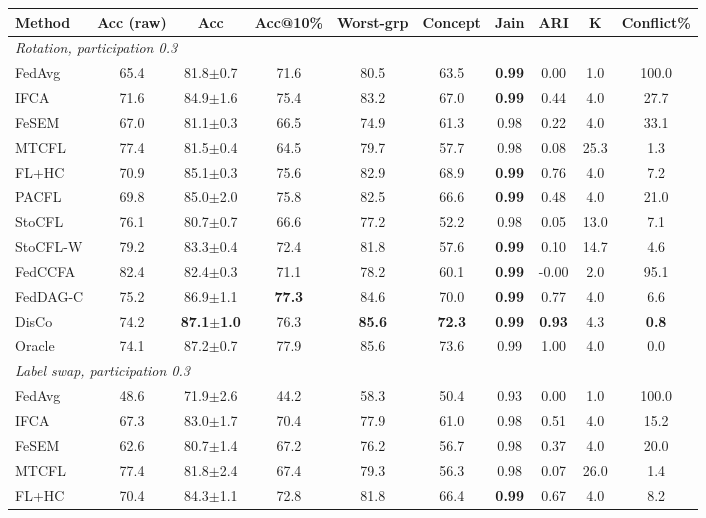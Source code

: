 \scriptsize
\setlength{\tabcolsep}{3.2pt}
\begin{tabular}{lccccccccc}
\toprule
Method & Acc (raw) & Acc & Acc@10\% & Worst-grp & Concept & Jain & ARI & K & Conflict\% \\
\midrule
\multicolumn{10}{l}{\textit{Rotation, participation 0.3}}\\
FedAvg & 65.4 & 81.8$\pm$0.7 & 71.6 & 80.5 & 63.5 & \textbf{0.99} & 0.00 & 1.0 & 100.0 \\
IFCA & 71.6 & 84.9$\pm$1.6 & 75.4 & 83.2 & 67.0 & \textbf{0.99} & 0.44 & 4.0 & 27.7 \\
FeSEM & 67.0 & 81.1$\pm$0.3 & 66.5 & 74.9 & 61.3 & 0.98 & 0.22 & 4.0 & 33.1 \\
MTCFL & 77.4 & 81.5$\pm$0.4 & 64.5 & 79.7 & 57.7 & 0.98 & 0.08 & 25.3 & 1.3 \\
FL+HC & 70.9 & 85.1$\pm$0.3 & 75.6 & 82.9 & 68.9 & \textbf{0.99} & 0.76 & 4.0 & 7.2 \\
PACFL & 69.8 & 85.0$\pm$2.0 & 75.8 & 82.5 & 66.6 & \textbf{0.99} & 0.48 & 4.0 & 21.0 \\
StoCFL & 76.1 & 80.7$\pm$0.7 & 66.6 & 77.2 & 52.2 & 0.98 & 0.05 & 13.0 & 7.1 \\
StoCFL-W & 79.2 & 83.3$\pm$0.4 & 72.4 & 81.8 & 57.6 & \textbf{0.99} & 0.10 & 14.7 & 4.6 \\
FedCCFA & 82.4 & 82.4$\pm$0.3 & 71.1 & 78.2 & 60.1 & \textbf{0.99} & -0.00 & 2.0 & 95.1 \\
FedDAG-C & 75.2 & 86.9$\pm$1.1 & \textbf{77.3} & 84.6 & 70.0 & \textbf{0.99} & 0.77 & 4.0 & 6.6 \\
DisCo & 74.2 & \textbf{87.1$\pm$1.0} & 76.3 & \textbf{85.6} & \textbf{72.3} & \textbf{0.99} & \textbf{0.93} & 4.3 & \textbf{0.8} \\
Oracle & 74.1 & 87.2$\pm$0.7 & 77.9 & 85.6 & 73.6 & 0.99 & 1.00 & 4.0 & 0.0 \\
\midrule
\multicolumn{10}{l}{\textit{Label swap, participation 0.3}}\\
FedAvg & 48.6 & 71.9$\pm$2.6 & 44.2 & 58.3 & 50.4 & 0.93 & 0.00 & 1.0 & 100.0 \\
IFCA & 67.3 & 83.0$\pm$1.7 & 70.4 & 77.9 & 61.0 & 0.98 & 0.51 & 4.0 & 15.2 \\
FeSEM & 62.6 & 80.7$\pm$1.4 & 67.2 & 76.2 & 56.7 & 0.98 & 0.37 & 4.0 & 20.0 \\
MTCFL & 77.4 & 81.8$\pm$2.4 & 67.4 & 79.3 & 56.3 & 0.98 & 0.07 & 26.0 & 1.4 \\
FL+HC & 70.4 & 84.3$\pm$1.1 & 72.8 & 81.8 & 66.4 & \textbf{0.99} & 0.67 & 4.0 & 8.2 \\

\end{tabular}

